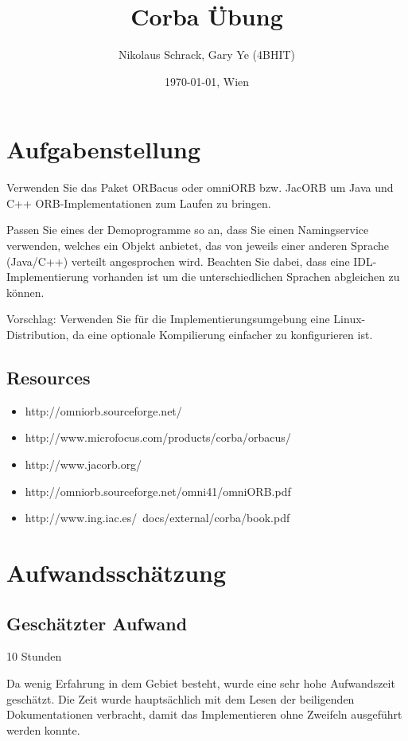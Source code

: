 \documentclass[11pt]{article}
\title{Corba Übung}
\author{Nikolaus Schrack, Gary Ye (4BHIT)}
\date{\today{}, Wien}
\begin{document}
\maketitle

\tableofcontents
\newpage

\section{Aufgabenstellung}
Verwenden Sie das Paket ORBacus oder omniORB bzw. JacORB um Java und C++ ORB-Implementationen zum Laufen zu bringen.

Passen Sie eines der Demoprogramme so an, dass Sie einen Namingservice verwenden, welches ein Objekt anbietet, das von jeweils einer anderen Sprache (Java/C++) verteilt angesprochen wird. Beachten Sie dabei, dass eine IDL-Implementierung vorhanden ist um die unterschiedlichen Sprachen abgleichen zu können.

Vorschlag: Verwenden Sie für die Implementierungsumgebung eine Linux-Distribution, da eine optionale Kompilierung einfacher zu konfigurieren ist.

\subsection{Resources}

\begin{itemize}
\item http://omniorb.sourceforge.net/
\item http://www.microfocus.com/products/corba/orbacus/
\item http://www.jacorb.org/
\item http://omniorb.sourceforge.net/omni41/omniORB.pdf
\item http://www.ing.iac.es/~docs/external/corba/book.pdf
\end{itemize}

\section{Aufwandsschätzung}
\subsection{Geschätzter Aufwand}
10 Stunden

Da wenig Erfahrung in dem Gebiet besteht, wurde eine sehr hohe Aufwandszeit geschätzt. Die Zeit wurde hauptsächlich mit dem Lesen der beiligenden Dokumentationen verbracht, damit das Implementieren ohne Zweifeln ausgeführt werden konnte.
\end{document}

